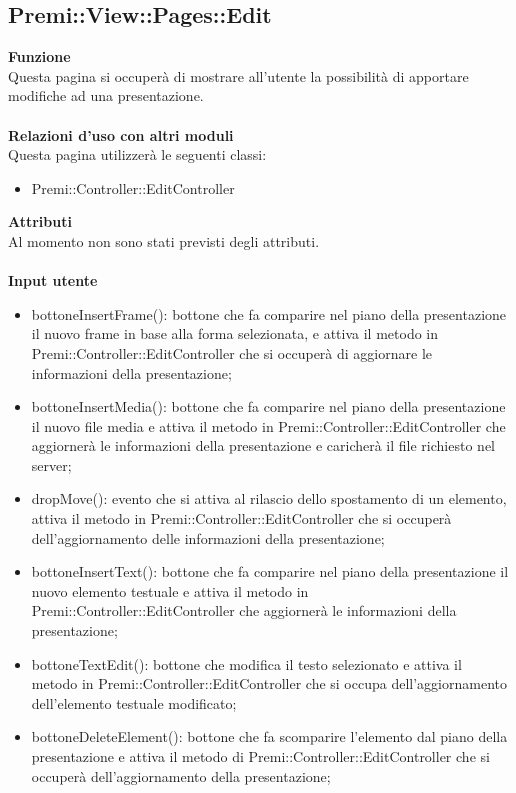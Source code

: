 {					\subsection{Premi::View::Pages::Edit}{
						\textbf{Funzione}\\
						\indent Questa pagina si occuperà di mostrare all'utente la possibilità di apportare modifiche ad una presentazione.\\\\
						\textbf{Relazioni d'uso con altri moduli}\\
						\indent Questa pagina utilizzerà le seguenti classi:
						\begin{itemize}
							\item Premi::Controller::EditController
						\end{itemize}
						\textbf{Attributi}\\
						\indent Al momento non sono stati previsti degli attributi.\\\\
						\textbf{Input utente}
						\begin{itemize}
							\item bottoneInsertFrame(): bottone che fa comparire nel piano della presentazione il nuovo frame in base alla forma selezionata, e attiva il metodo in Premi::Controller::EditController che si occuperà di aggiornare le informazioni della presentazione;
							\item bottoneInsertMedia(): bottone che fa comparire nel piano della presentazione il nuovo file media e attiva il metodo in Premi::Controller::EditController che aggiornerà le informazioni della presentazione e caricherà il file richiesto nel server;
							\item dropMove(): evento che si attiva al rilascio dello spostamento di un elemento, attiva il metodo in Premi::Controller::EditController che si occuperà dell'aggiornamento delle informazioni della presentazione;
							\item bottoneInsertText(): bottone che fa comparire nel piano della presentazione il nuovo elemento testuale e attiva il metodo in Premi::Controller::EditController che aggiornerà le informazioni della presentazione;
							\item bottoneTextEdit(): bottone che modifica il testo selezionato e attiva il metodo in Premi::Controller::EditController che si occupa dell'aggiornamento dell'elemento testuale modificato; 
							\item bottoneDeleteElement(): bottone che fa scomparire l'elemento dal piano della presentazione e attiva il metodo di Premi::Controller::EditController che si occuperà dell'aggiornamento della presentazione;

\end{itemize}}}
